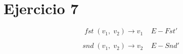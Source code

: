 \documentclass[11pt, fleqn]{article}
\begin{document}

\section*{Ejercicio 7}


\begin{prooftree}


\end{prooftree}

\begin{prooftree}


\end{prooftree}

\begin{prooftree}


\end{prooftree}

\begin{prooftree}


\end{prooftree}

\begin{equation*}
    fst \; (v_1, \; v_2) \rightarrow v_1 \; \; \; \; E-Fst'
\end{equation*}

\begin{equation*}   
    snd \; (v_1, \; v_2) \rightarrow v_2 \; \; \; \; E-Snd'
\end{equation*}


\end{document}
